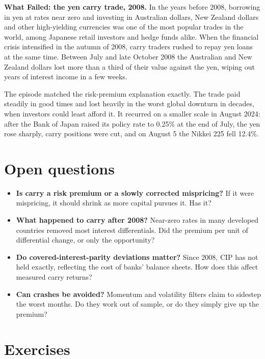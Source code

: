 \begin{callout}
\textbf{What Failed: the yen carry trade, 2008.} In the years before 2008, borrowing in yen at rates near zero and investing in Australian dollars, New Zealand dollars and other high-yielding currencies was one of the most popular trades in the world, among Japanese retail investors and hedge funds alike. When the financial crisis intensified in the autumn of 2008, carry traders rushed to repay yen loans at the same time. Between July and late October 2008 the Australian and New Zealand dollars lost more than a third of their value against the yen, wiping out years of interest income in a few weeks.

The episode matched the risk-premium explanation exactly. The trade paid steadily in good times and lost heavily in the worst global downturn in decades, when investors could least afford it. It recurred on a smaller scale in August 2024: after the Bank of Japan raised its policy rate to 0.25\% at the end of July, the yen rose sharply, carry positions were cut, and on August 5 the Nikkei 225 fell 12.4\%.
\end{callout}

\section{Open questions}
\label{sec:18-open}

\begin{itemize}
  \item \textbf{Is carry a risk premium or a slowly corrected mispricing?} If it were mispricing, it should shrink as more capital pursues it. Has it?
  \item \textbf{What happened to carry after 2008?} Near-zero rates in many developed countries removed most interest differentials. Did the premium per unit of differential change, or only the opportunity?
  \item \textbf{Do covered-interest-parity deviations matter?} Since 2008, CIP has not held exactly, reflecting the cost of banks' balance sheets. How does this affect measured carry returns?
  \item \textbf{Can crashes be avoided?} Momentum and volatility filters claim to sidestep the worst months. Do they work out of sample, or do they simply give up the premium?
\end{itemize}

\section*{Exercises}

